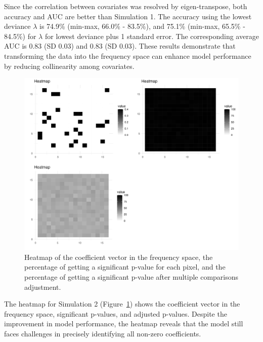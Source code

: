 \documentclass[12pt]{article}
\begin{document}
Since the correlation between covariates was resolved by eigen-transpose, both accuracy and AUC are better than Simulation 1. The accuracy using the lowest deviance \(\lambda\) is 74.9\% (min-max, 66.0\% - 83.5\%), and 75.1\% (min-max, 65.5\% - 84.5\%) for \(\lambda\) for lowest deviance plus 1 standard error. The corresponding average AUC is 0.83 (SD 0.03) and 0.83 (SD 0.03). These results demonstrate that transforming the data into the frequency space can enhance model performance by reducing collinearity among covariates.

\begin{figure}[H]
  \centering
  \includegraphics[width=\textwidth]{../Figures/sim2_heatmap.png}
  \caption{Heatmap of the coefficient vector in the frequency space, the percentage of getting a significant p-value for each pixel, and the percentage of getting a significant p-value after multiple comparisons adjustment.}
  \label{fig:sim2_heatmap}
\end{figure}

The heatmap for Simulation 2 (Figure~\ref{fig:sim2_heatmap}) shows the coefficient vector in the frequency space, significant p-values, and adjusted p-values. Despite the improvement in model performance, the heatmap reveals that the model still faces challenges in precisely identifying all non-zero coefficients.

\clearpage
\end{document}
